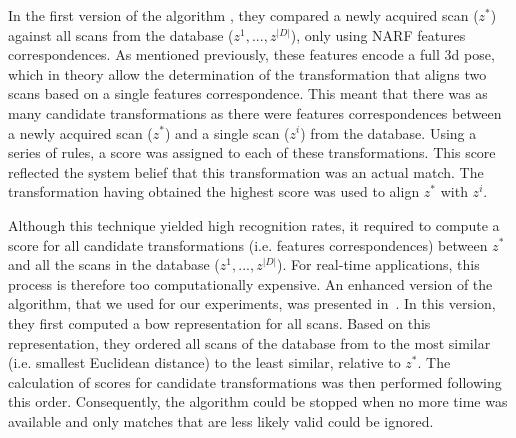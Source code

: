 In the first version of the algorithm \citep{Steder2010}, they compared a newly acquired scan ($z^*$) against all scans from the database ($z^1,...,z^{|D|}$), only using NARF features correspondences. As mentioned previously, these features encode a full \gls*{3d} pose, which in theory allow the determination of the transformation that aligns two scans based on a single features correspondence. This meant that there was as many candidate transformations as there were features correspondences between a newly acquired scan ($z^*$) and a single scan ($z^i$) from the database. Using a series of rules, a score was assigned to each of these transformations. This score reflected the system belief that this transformation was an actual match. The transformation having obtained the highest score was used to align $z^*$ with $z^i$.

Although this technique yielded high recognition rates, it required to compute a score for all candidate transformations (i.e. features correspondences) between $z^*$ and all the scans in the database ($z^1,...,z^{|D|}$). For real-time applications, this process is therefore too computationally expensive. An enhanced version of the algorithm, that we used for our experiments, was presented in~\cite{Steder2011b}. In this version, they first computed a \gls*{bow} representation for all scans. Based on this representation, they ordered all scans of the database from to the most similar (i.e. smallest Euclidean distance) to the least similar, relative to $z^*$. The calculation of scores for candidate transformations was then performed following this order. Consequently, the algorithm could be stopped when no more time was available and only matches that are less likely valid could be ignored. 


